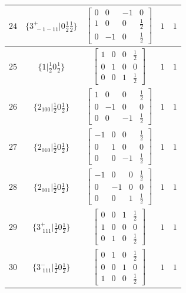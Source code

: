 \documentclass[fleqn,8pt]{jsarticle}
\begin{document}
\begin{longtable}{ccccc}
$ 24 $ & $ \{3^{+}_{\,\,-1-11}|0 \frac{1}{2} \frac{1}{2}\} $ & $ \begin{bmatrix} 0 & 0 & -1 & 0 \\ 1 & 0 & 0 & \frac{1}{2} \\ 0 & -1 & 0 & \frac{1}{2} \end{bmatrix} $ & $ 1 $ & $ 1 $ \\ \hline
$ 25 $ & $ \{1|\frac{1}{2} 0 \frac{1}{2}\} $ & $ \begin{bmatrix} 1 & 0 & 0 & \frac{1}{2} \\ 0 & 1 & 0 & 0 \\ 0 & 0 & 1 & \frac{1}{2} \end{bmatrix} $ & $ 1 $ & $ 1 $ \\ \hline
$ 26 $ & $ \{2{}_{100}|\frac{1}{2} 0 \frac{1}{2}\} $ & $ \begin{bmatrix} 1 & 0 & 0 & \frac{1}{2} \\ 0 & -1 & 0 & 0 \\ 0 & 0 & -1 & \frac{1}{2} \end{bmatrix} $ & $ 1 $ & $ 1 $ \\ \hline
$ 27 $ & $ \{2{}_{010}|\frac{1}{2} 0 \frac{1}{2}\} $ & $ \begin{bmatrix} -1 & 0 & 0 & \frac{1}{2} \\ 0 & 1 & 0 & 0 \\ 0 & 0 & -1 & \frac{1}{2} \end{bmatrix} $ & $ 1 $ & $ 1 $ \\ \hline
$ 28 $ & $ \{2{}_{001}|\frac{1}{2} 0 \frac{1}{2}\} $ & $ \begin{bmatrix} -1 & 0 & 0 & \frac{1}{2} \\ 0 & -1 & 0 & 0 \\ 0 & 0 & 1 & \frac{1}{2} \end{bmatrix} $ & $ 1 $ & $ 1 $ \\ \hline
$ 29 $ & $ \{3^{+}_{\,\,111}|\frac{1}{2} 0 \frac{1}{2}\} $ & $ \begin{bmatrix} 0 & 0 & 1 & \frac{1}{2} \\ 1 & 0 & 0 & 0 \\ 0 & 1 & 0 & \frac{1}{2} \end{bmatrix} $ & $ 1 $ & $ 1 $ \\ \hline
$ 30 $ & $ \{3^{-}_{\,\,111}|\frac{1}{2} 0 \frac{1}{2}\} $ & $ \begin{bmatrix} 0 & 1 & 0 & \frac{1}{2} \\ 0 & 0 & 1 & 0 \\ 1 & 0 & 0 & \frac{1}{2} \end{bmatrix} $ & $ 1 $ & $ 1 $ \\ \hline

\end{longtable}
\end{document}

